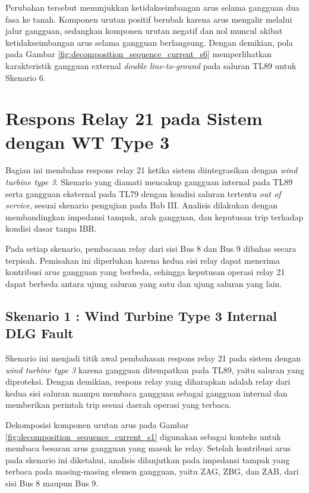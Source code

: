 Perubahan tersebut menunjukkan ketidakseimbangan arus selama gangguan dua fasa ke tanah. Komponen urutan positif berubah karena arus mengalir melalui jalur gangguan, sedangkan komponen urutan negatif dan nol muncul akibat ketidakseimbangan arus selama gangguan berlangsung. Dengan demikian, pola pada Gambar \ref{fig:decomposition_sequence_current_s6} memperlihatkan karakteristik gangguan external \textit{double line-to-ground} pada saluran TL89 untuk Skenario 6.

\section{Respons Relay 21 pada Sistem dengan WT Type 3}
\label{sec:respon_relay 21_WTT3}

Bagian ini membahas respons relay 21 ketika sistem diintegrasikan dengan \textit{wind turbine type 3}. Skenario yang diamati mencakup gangguan internal pada TL89 serta gangguan eksternal pada TL79 dengan kondisi saluran tertentu \textit{out of service}, sesuai skenario pengujian pada Bab III. Analisis dilakukan dengan membandingkan impedansi tampak, arah gangguan, dan keputusan trip terhadap kondisi dasar tanpa IBR.

Pada setiap skenario, pembacaan relay dari sisi Bus 8 dan Bus 9 dibahas secara terpisah. Pemisahan ini diperlukan karena kedua sisi relay dapat menerima kontribusi arus gangguan yang berbeda, sehingga keputusan operasi relay 21 dapat berbeda antara ujung saluran yang satu dan ujung saluran yang lain.

\subsection{Skenario 1 : Wind Turbine Type 3 Internal DLG Fault}

Skenario ini menjadi titik awal pembahasan respons relay 21 pada sistem dengan \textit{wind turbine type 3} karena gangguan ditempatkan pada TL89, yaitu saluran yang diproteksi. Dengan demikian, respons relay yang diharapkan adalah relay dari kedua sisi saluran mampu membaca gangguan sebagai gangguan internal dan memberikan perintah trip sesuai daerah operasi yang terbaca.

Dekomposisi komponen urutan arus pada Gambar \ref{fig:decomposition_sequence_current_s1} digunakan sebagai konteks untuk membaca besaran arus gangguan yang masuk ke relay. Setelah kontribusi arus pada skenario ini diketahui, analisis dilanjutkan pada impedansi tampak yang terbaca pada masing-masing elemen gangguan, yaitu ZAG, ZBG, dan ZAB, dari sisi Bus 8 maupun Bus 9.

